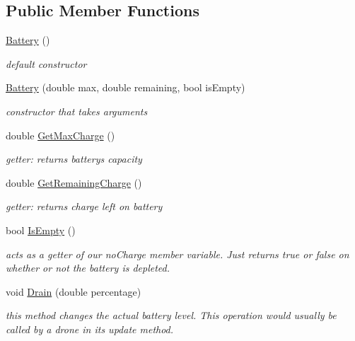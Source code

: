 \subsection*{Public Member Functions}
\begin{DoxyCompactItemize}
\item 
\mbox{\label{classBattery_a36a6234c583e3b3506f4a77e3eb49989}} 
\hyperlink{classBattery_a36a6234c583e3b3506f4a77e3eb49989}{Battery} ()
\begin{DoxyCompactList}\small\item\em default constructor \end{DoxyCompactList}\item 
\mbox{\label{classBattery_a06a6a638724aeb3a1e45854a5e0e0b1c}} 
\hyperlink{classBattery_a06a6a638724aeb3a1e45854a5e0e0b1c}{Battery} (double max, double remaining, bool is\+Empty)
\begin{DoxyCompactList}\small\item\em constructor that takes arguments \end{DoxyCompactList}\item 
\mbox{\label{classBattery_a40f54aa571826d0109465539bbc304b9}} 
double \hyperlink{classBattery_a40f54aa571826d0109465539bbc304b9}{Get\+Max\+Charge} ()
\begin{DoxyCompactList}\small\item\em getter\+: returns battery\textquotesingle{}s capacity \end{DoxyCompactList}\item 
\mbox{\label{classBattery_a4abbd8d0e5005b17bfb6ed4e0038641a}} 
double \hyperlink{classBattery_a4abbd8d0e5005b17bfb6ed4e0038641a}{Get\+Remaining\+Charge} ()
\begin{DoxyCompactList}\small\item\em getter\+: returns charge left on battery \end{DoxyCompactList}\item 
\mbox{\label{classBattery_a2b7a3315b5e1ca9c74ee64acf0bb2168}} 
bool \hyperlink{classBattery_a2b7a3315b5e1ca9c74ee64acf0bb2168}{Is\+Empty} ()
\begin{DoxyCompactList}\small\item\em acts as a getter of our no\+Charge member variable. Just returns true or false on whether or not the battery is depleted. \end{DoxyCompactList}\item 
\mbox{\label{classBattery_af3e0488dbe063350f3ab9077487d1e12}} 
void \hyperlink{classBattery_af3e0488dbe063350f3ab9077487d1e12}{Drain} (double percentage)
\begin{DoxyCompactList}\small\item\em this method changes the actual battery level. This operation would usually be called by a drone in it\textquotesingle{}s update method. \end{DoxyCompactList}\end{DoxyCompactItemize}
